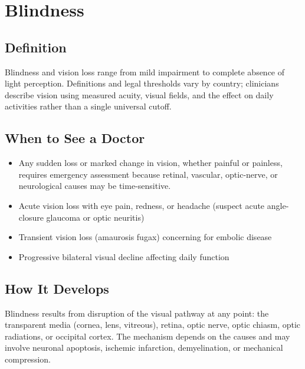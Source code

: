 \chapter{Blindness}

\section*{Definition}
Blindness and vision loss range from mild impairment to complete absence of light perception. Definitions and legal thresholds vary by country; clinicians describe vision using measured acuity, visual fields, and the effect on daily activities rather than a single universal cutoff.

\section*{When to See a Doctor}

\begin{itemize}
 \item Any sudden loss or marked change in vision, whether painful or painless, requires emergency assessment because retinal, vascular, optic-nerve, or neurological causes may be time-sensitive.
 \item Acute vision loss with eye pain, redness, or headache (suspect acute angle-closure glaucoma or optic neuritis)
 \item Transient vision loss (amaurosis fugax) concerning for embolic disease
 \item Progressive bilateral visual decline affecting daily function
\end{itemize}

\section*{How It Develops}
Blindness results from disruption of the visual pathway at any point: the transparent media (cornea, lens, vitreous), retina, optic nerve, optic chiasm, optic radiations, or occipital cortex. The mechanism depends on the causes and may involve neuronal apoptosis, ischemic infarction, demyelination, or mechanical compression.

